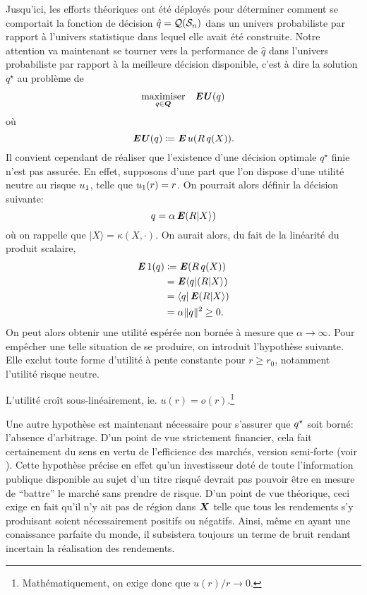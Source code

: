 Jusqu'ici, les efforts théoriques ont été déployés pour déterminer comment se comportait
la fonction de décision $\hat q = \alg(\S_n)$ dans un univers probabiliste par rapport à
l'univers statistique dans lequel elle avait été construite. Notre attention va maintenant
se tourner vers la performance de $\hat q$ dans l'univers probabiliste par rapport à la
meilleure décision disponible, c'est à dire la solution $q^\star$ au problème de 
\begin{equation}
  \maximizeEquation[q \in \Q]{\EU(q)}
\end{equation}
où
\begin{equation}
  \EU(q) \coloneq \E u(R\,q(X)).
\end{equation}
Il convient cependant de réaliser que l'existence d'une décision optimale $q^\star$ finie
n'est pas assurée. En effet, supposons d'une part que l'on dispose d'une utilité neutre au
risque $\rn$, telle que $\rn(r) = r$. On pourrait alors définir la décision suivante:
\begin{equation}
  q = \alpha\E(R|X\rangle)
\end{equation}
où on rappelle que $|X\rangle = \kappa(X,\cdot)$. On aurait alors, du fait de la linéarité du produit
scalaire,
\begin{align}
  \E1(q) & \coloneq \E(R\,q(X))\\
         & = \E\langle q|(R|X\rangle)\\
         & = \langle q|\E(R|X\rangle)\\
         & = \alpha\|q\|^2 \geq 0.
\end{align}
On peut alors obtenir une utilité espérée non bornée à mesure que $\alpha\to\infty$. Pour empêcher une
telle situation de se produire, on introduit l'hypothèse suivante. Elle exclut toute forme
d'utilité à pente constante pour $r \geq r_0$, notamment l'utilité risque neutre.
\begin{assumption}
  L'utilité croît sous-linéairement, ie. $u(r) = o(r)$.\footnote{Mathématiquement, on exige
    donc que $u(r)/r \to 0$.} 
\end{assumption}

Une autre hypothèse est maintenant nécessaire pour s'assurer que $\qs$ soit borné:
l'absence d'arbitrage. D'un point de vue strictement financier, cela fait certainement du
sens en vertu de l'efficience des marchés, version semi-forte (voir
\cite{fama1970efficient}). Cette hypothèse précise en effet qu'un investisseur doté de
toute l'information publique disponible au sujet d'un titre risqué devrait pas pouvoir
être en mesure de ``battre'' le marché sans prendre de risque. D'un point de vue
théorique, ceci exige en fait qu'il n'y ait pas de région dans $\X$ telle que tous les
rendements s'y produisant soient nécessairement positifs ou négatifs. Ainsi, même en ayant
une conaissance parfaite du monde, il subsistera toujours un terme de bruit rendant
incertain la réalisation des rendements.

